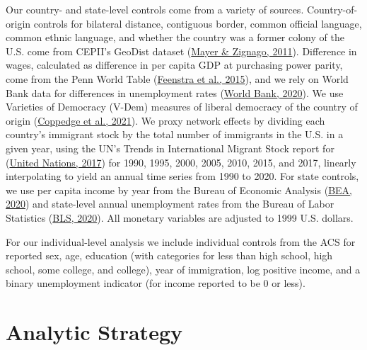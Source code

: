 \documentclass[
  11pt,
]{article}
\begin{document}
Our country- and state-level controls come from a variety of sources. Country-of-origin controls for bilateral distance, contiguous border, common official language, common ethnic language, and whether the country was a former colony of the U.S. come from CEPII's GeoDist dataset (\protect\hyperlink{ref-mayer_2011}{Mayer \& Zignago, 2011}). Difference in wages, calculated as difference in per capita GDP at purchasing power parity, come from the Penn World Table (\protect\hyperlink{ref-feenstra_2015}{Feenstra et al., 2015}), and we rely on World Bank data for differences in unemployment rates (\protect\hyperlink{ref-worldbank_2020}{World Bank, 2020}). We use Varieties of Democracy (V-Dem) measures of liberal democracy of the country of origin (\protect\hyperlink{ref-coppedge_2021}{Coppedge et al., 2021}). We proxy network effects by dividing each country's immigrant stock by the total number of immigrants in the U.S. in a given year, using the UN's Trends in International Migrant Stock report for (\protect\hyperlink{ref-unitednations_2017}{United Nations, 2017}) for 1990, 1995, 2000, 2005, 2010, 2015, and 2017, linearly interpolating to yield an annual time series from 1990 to 2020. For state controls, we use per capita income by year from the Bureau of Economic Analysis (\protect\hyperlink{ref-bea_2020}{BEA, 2020}) and state-level annual unemployment rates from the Bureau of Labor Statistics (\protect\hyperlink{ref-bls_2020}{BLS, 2020}). All monetary variables are adjusted to 1999 U.S. dollars.

For our individual-level analysis we include individual controls from the ACS for reported sex, age, education (with categories for less than high school, high school, some college, and college), year of immigration, log positive income, and a binary unemployment indicator (for income reported to be 0 or less).

\hypertarget{analytic-strategy}{%
\section{Analytic Strategy}\label{analytic-strategy}}
\end{document}
